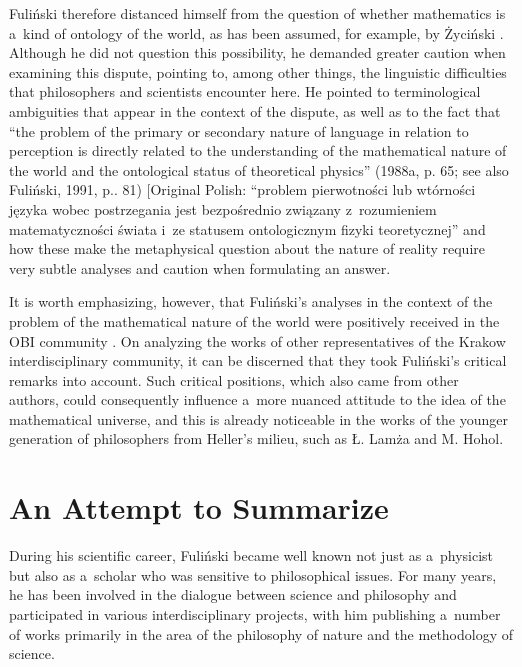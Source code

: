 Fuliński therefore distanced himself from the question of whether mathematics is a~kind of ontology of the world, as has been assumed, for example, by Życiński 
\parencite*[][]{zycinski_swiat_2013}. %
 Although he did not question this possibility, he demanded greater caution when examining this dispute, pointing to, among other things, the linguistic difficulties that philosophers and scientists encounter here. He pointed to terminological ambiguities that appear in the context of the dispute, as well as to the fact that ``the problem of the primary or secondary nature of language in relation to perception is directly related to the understanding of the mathematical nature of the world and the ontological status of theoretical physics'' (1988a, p. 65; see also Fuliński, 1991, p.. 81) [Original Polish: ``problem pierwotności lub wtórności języka wobec postrzegania jest bezpośrednio związany z~rozumieniem matematyczności świata i~ze statusem ontologicznym fizyki teoretycznej'' 
\parencites[][p.65]{janik_glos_1988}[see also 1991p.8][]{} %
 and how these make the metaphysical question about the nature of reality require very subtle analyses and caution when formulating an answer.



It is worth emphasizing, however, that Fuliński's analyses in the context of the problem of the mathematical nature of the world were positively received in the OBI community 
\parencite[e.g][pp.217–218]{zycinski_teizm_1988}. %
 On analyzing the works of other representatives of the Krakow interdisciplinary community, it can be discerned that they took Fuliński's critical remarks into account. Such critical positions, which also came from other authors, could consequently influence a~more nuanced attitude to the idea of the mathematical universe, and this is already noticeable in the works of the younger generation of philosophers from Heller's milieu, such as Ł. Lamża and M. Hohol.



\section{An Attempt to Summarize}

During his scientific career, Fuliński became well known not just as a~physicist but also as a~scholar who was sensitive to philosophical issues. For many years, he has been involved in the dialogue between science and philosophy and participated in various interdisciplinary projects, with him publishing a~number of works primarily in the area of the philosophy of nature and the methodology of science.



